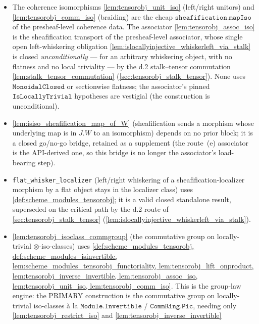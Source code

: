\begin{itemize}
    \(\Scheme.\mathtt{Modules}\,X\); it is stated-but-unformalized, pending the
    sole open proof obligation.
  \item The coherence isomorphisms \cref{lem:tensorobj_unit_iso}
    (left/right unitors) and \cref{lem:tensorobj_comm_iso} (braiding) are the cheap
    \(\mathtt{sheafification.mapIso}\) of the presheaf-level coherence data. The
    associator \cref{lem:tensorobj_assoc_iso} is the sheafification transport of the
    presheaf-level associator, whose single open left-whiskering obligation
    \cref{lem:islocallyinjective_whiskerleft_via_stalk} is closed
    \emph{unconditionally} --- for an arbitrary whiskering object, with no flatness and
    no local triviality --- by the d.2 stalk--tensor commutation
    \cref{lem:stalk_tensor_commutation} (\cref{sec:tensorobj_stalk_tensor}).
    None uses \(\mathtt{MonoidalClosed}\) or sectionwise flatness; the associator's
    pinned \(\mathtt{IsLocallyTrivial}\) hypotheses are vestigial (the construction is
    unconditional).
  \item \cref{lem:isiso_sheafification_map_of_W} (sheafification sends a
    morphism whose underlying map is in \(J.W\) to an isomorphism) depends on no
    prior block; it is a closed go/no-go bridge, retained as a supplement (the
    route~(e) associator is the API-derived one, so this bridge is no longer the
    associator's load-bearing step).
  \item \texttt{flat\_whisker\_localizer} (left/right whiskering of a
    sheafification-localizer morphism by a flat object stays in the localizer
    class) uses \cref{def:scheme_modules_tensorobj}; it is a valid closed
    standalone result, superseded on the critical path by the d.2 route of
    \cref{sec:tensorobj_stalk_tensor}
    (\cref{lem:islocallyinjective_whiskerleft_via_stalk}).
  \item \cref{lem:tensorobj_isoclass_commgroup} (the commutative group on
    locally-trivial \(\otimes\)-iso-classes) uses
    \cref{def:scheme_modules_tensorobj,
          def:scheme_modules_isinvertible,
          lem:scheme_modules_tensorobj_functoriality,
          lem:tensorobj_lift_onproduct,
          lem:tensorobj_inverse_invertible,
          lem:tensorobj_assoc_iso,
          lem:tensorobj_unit_iso,
          lem:tensorobj_comm_iso}. This is the group-law engine: the PRIMARY
    construction is the commutative group on locally-trivial iso-classes à la
    \(\mathtt{Module.Invertible}\) / \(\mathtt{CommRing.Pic}\), needing only
    \cref{lem:tensorobj_restrict_iso} and \cref{lem:tensorobj_inverse_invertible}

\end{itemize}
